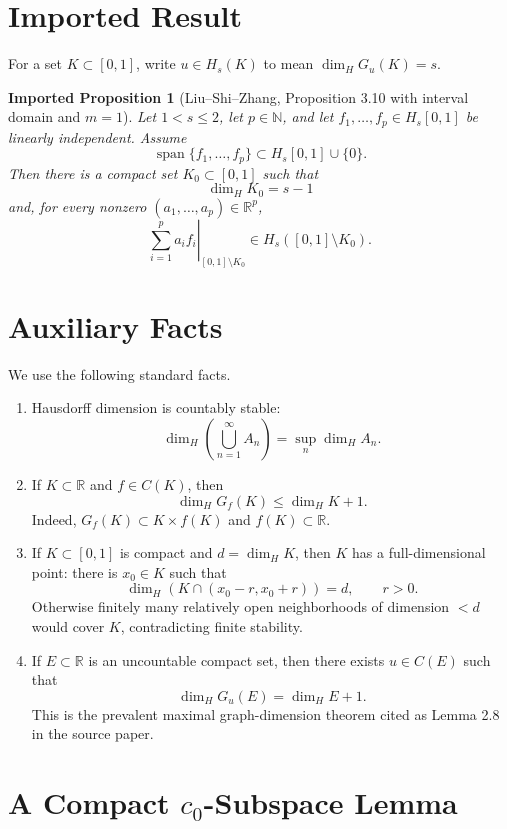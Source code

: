 \documentclass[11pt]{article}
\newtheorem*{proposition}{Imported Proposition}
\newcommand{\NN}{\mathbb N}
\newcommand{\RR}{\mathbb R}
\newcommand{\dimH}{\dim_{\!H}}
\newcommand{\spanop}{\operatorname{span}}
\begin{document}
\section*{Imported Result}

For a set \(K\subset[0,1]\), write \(u\in H_s(K)\) to mean
\(\dimH G_u(K)=s\).

\begin{proposition}[Liu--Shi--Zhang, Proposition 3.10 with interval domain and \(m=1\)]
Let \(1<s\leq2\), let \(p\in\NN\), and let
\(f_1,\ldots,f_p\in H_s[0,1]\) be linearly independent.  Assume
\[
\spanop\{f_1,\ldots,f_p\}\subset H_s[0,1]\cup\{0\}.
\]
Then there is a compact set \(K_0\subset[0,1]\) such that
\[
\dimH K_0=s-1
\]
and, for every nonzero \((a_1,\ldots,a_p)\in\RR^p\),
\[
\left.\sum_{i=1}^p a_i f_i\right|_{[0,1]\setminus K_0}
\in H_s([0,1]\setminus K_0).
\]
\end{proposition}

\section*{Auxiliary Facts}

We use the following standard facts.

\begin{enumerate}[label=(F\arabic*),leftmargin=*]
\item Hausdorff dimension is countably stable:
\[
\dimH\left(\bigcup_{n=1}^{\infty} A_n\right)=\sup_n \dimH A_n.
\]
\item If \(K\subset\RR\) and \(f\in C(K)\), then
\[
\dimH G_f(K)\leq \dimH K+1.
\]
Indeed, \(G_f(K)\subset K\times f(K)\) and \(f(K)\subset\RR\).
\item If \(K\subset[0,1]\) is compact and \(d=\dimH K\), then \(K\) has a
full-dimensional point: there is \(x_0\in K\) such that
\[
\dimH(K\cap(x_0-r,x_0+r))=d,\qquad r>0.
\]
Otherwise finitely many relatively open neighborhoods of dimension \(<d\)
would cover \(K\), contradicting finite stability.
\item If \(E\subset\RR\) is an uncountable compact set, then there exists
\(u\in C(E)\) such that
\[
\dimH G_u(E)=\dimH E+1.
\]
This is the prevalent maximal graph-dimension theorem cited as Lemma 2.8 in
the source paper.
\end{enumerate}

\section*{A Compact \(c_0\)-Subspace Lemma}
\end{document}
